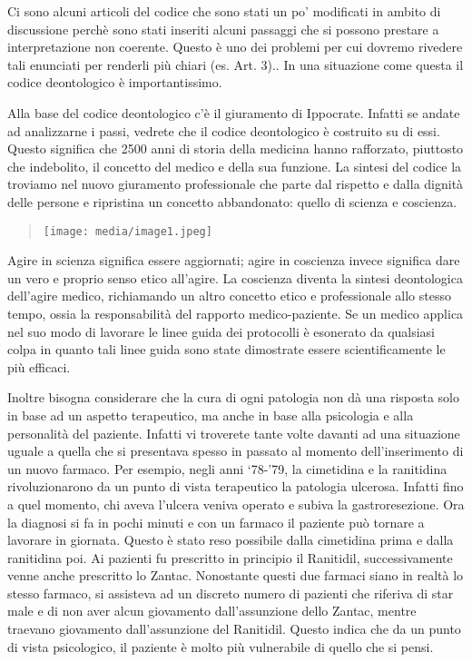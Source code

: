 \documentclass[]{article}
\begin{document}
Ci sono alcuni articoli del codice che sono stati un po' modificati in
ambito di discussione perchè sono stati inseriti alcuni passaggi che si
possono prestare a interpretazione non coerente. Questo è uno dei
problemi per cui dovremo rivedere tali enunciati per renderli più chiari
(es. Art. 3).. In una situazione come questa il codice deontologico è
importantissimo.

Alla base del codice deontologico c'è il giuramento di Ippocrate.
Infatti se andate ad analizzarne i passi, vedrete che il codice
deontologico è costruito su di essi. Questo significa che 2500 anni di
storia della medicina hanno rafforzato, piuttosto che indebolito, il
concetto del medico e della sua funzione. La sintesi del codice la
troviamo nel nuovo giuramento professionale che parte dal rispetto e
dalla dignità delle persone e ripristina un concetto abbandonato: quello
di scienza e coscienza.

\begin{quote}
\texttt{[image: media/image1.jpeg]}
\end{quote}

Agire in scienza significa essere aggiornati; agire in coscienza invece
significa dare un vero e proprio senso etico all'agire. La coscienza
diventa la sintesi deontologica dell'agire medico, richiamando un altro
concetto etico e professionale allo stesso tempo, ossia la
responsabilità del rapporto medico-paziente. Se un medico applica nel
suo modo di lavorare le linee guida dei protocolli è esonerato da
qualsiasi colpa in quanto tali linee guida sono state dimostrate essere
scientificamente le più efficaci.

Inoltre bisogna considerare che la cura di ogni patologia non dà una
risposta solo in base ad un aspetto terapeutico, ma anche in base alla
psicologia e alla personalità del paziente. Infatti vi troverete tante
volte davanti ad una situazione uguale a quella che si presentava spesso
in passato al momento dell'inserimento di un nuovo farmaco. Per esempio,
negli anni `78-'79, la cimetidina e la ranitidina rivoluzionarono da un
punto di vista terapeutico la patologia ulcerosa. Infatti fino a quel
momento, chi aveva l'ulcera veniva operato e subiva la gastroresezione.
Ora la diagnosi si fa in pochi minuti e con un farmaco il paziente può
tornare a lavorare in giornata. Questo è stato reso possibile dalla
cimetidina prima e dalla ranitidina poi. Ai pazienti fu prescritto in
principio il Ranitidil, successivamente venne anche prescritto lo
Zantac. Nonostante questi due farmaci siano in realtà lo stesso farmaco,
si assisteva ad un discreto numero di pazienti che riferiva di star male
e di non aver alcun giovamento dall'assunzione dello Zantac, mentre
traevano giovamento dall'assunzione del Ranitidil. Questo indica che da
un punto di vista psicologico, il paziente è molto più vulnerabile di
quello che si pensi.
\end{document}
